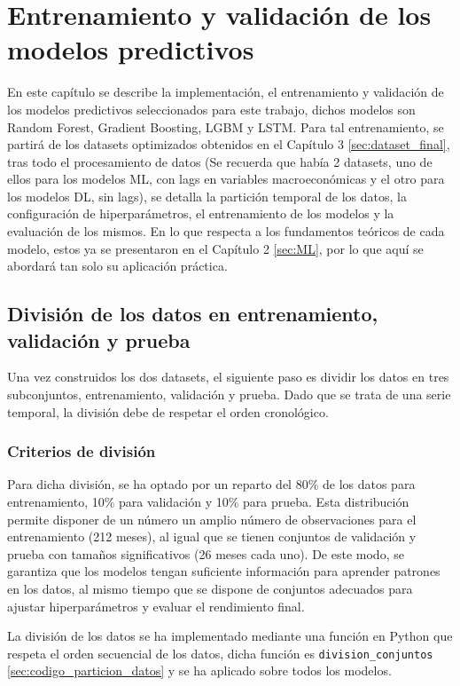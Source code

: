 \chapter{Entrenamiento y validación de los modelos predictivos}
\label{ch:EntrenamientoModelos}
En este capítulo se describe la implementación, el entrenamiento y validación de los modelos predictivos seleccionados para este trabajo, dichos modelos son Random Forest, Gradient Boosting, LGBM y LSTM. Para tal entrenamiento, se partirá de los datasets optimizados obtenidos en el Capítulo 3 \ref{sec:dataset_final}, tras todo el procesamiento de datos  (Se recuerda que había 2 datasets, uno de ellos para los modelos ML, con lags en variables macroeconómicas y el otro para los modelos DL, sin lags), se detalla la partición temporal de los datos, la configuración de hiperparámetros, el entrenamiento de los modelos y la evaluación de los mismos. En lo que respecta a los fundamentos teóricos de cada modelo, estos ya se presentaron en el Capítulo 2 \ref{sec:ML}, por lo que aquí se abordará tan solo su aplicación práctica.

\section{División de los datos en entrenamiento, validación y prueba}
Una vez construidos los dos datasets, el siguiente paso es dividir los datos en tres subconjuntos, entrenamiento, validación y prueba. Dado que se trata de una serie temporal, la división debe de respetar el orden cronológico.

\subsection{Criterios de división}
Para dicha división, se ha optado por un reparto del 80\% de los datos para entrenamiento, 10\% para validación y 10\% para prueba. Esta distribución permite disponer de un número un amplio número de observaciones para el entrenamiento (212 meses), al igual que se tienen conjuntos de validación y prueba con tamaños significativos (26 meses cada uno). De este modo, se garantiza que los modelos tengan suficiente información para aprender patrones en los datos, al mismo tiempo que se dispone de conjuntos adecuados para ajustar hiperparámetros y evaluar el rendimiento final.

La división de los datos se ha implementado mediante una función en Python \cite{python_docs} que respeta el orden secuencial de los datos, dicha función es \texttt{division\_conjuntos} \ref{sec:codigo_particion_datos} y se ha aplicado sobre todos los modelos.

